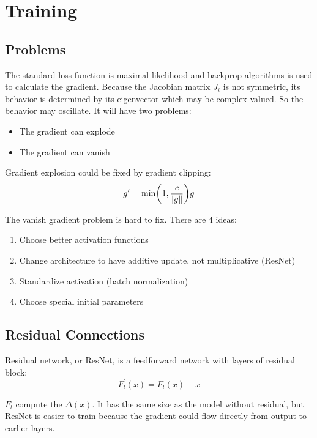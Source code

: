 \chapter{Training}

\section{Problems}
The standard loss function is maximal likelihood and backprop algorithms is used to calculate the gradient. Because the Jacobian matrix $J_i$ is not symmetric, its behavior is determined by its eigenvector which may be complex-valued. So the behavior may oscillate. It will have two problems:
\begin{itemize}
    \item The gradient can explode
    \item The gradient can vanish
\end{itemize}

Gradient explosion could be fixed by gradient clipping:
\begin{equation}
    g' = \min \mleft(1, \frac{c}{\norm{g}}\mright)g
\end{equation}

The vanish gradient problem is hard to fix. There are 4 ideas:
\begin{enumerate}
    \item Choose better activation functions
    \item Change architecture to have additive update, not multiplicative (ResNet)
    \item Standardize activation (batch normalization)
    \item Choose special initial parameters
\end{enumerate}


\section{Residual Connections}

Residual network, or ResNet, is a feedforward network with layers of residual block:
\begin{equation}
    F_l^{'} (x) = F_l (x) + x
\end{equation}

$F_l$ compute the $\Delta(x)$. It has the same size as the model without residual, but ResNet is easier to train because the gradient could flow directly from output to earlier layers.


